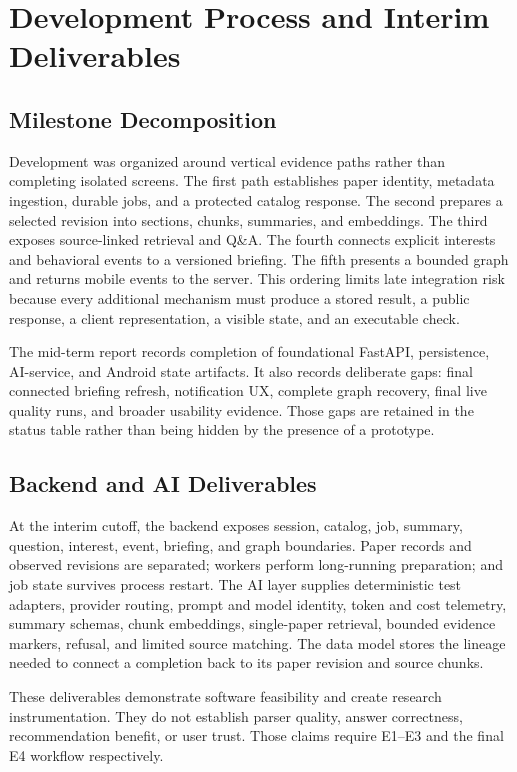 \section{Development Process and Interim Deliverables}

\subsection{Milestone Decomposition}

Development was organized around vertical evidence paths rather than completing isolated screens.
The first path establishes paper identity, metadata ingestion, durable jobs, and a protected catalog response.
The second prepares a selected revision into sections, chunks, summaries, and embeddings.
The third exposes source-linked retrieval and Q\&A.
The fourth connects explicit interests and behavioral events to a versioned briefing.
The fifth presents a bounded graph and returns mobile events to the server.
This ordering limits late integration risk because every additional mechanism must produce a stored result, a public response, a client representation, a visible state, and an executable check.

The mid-term report records completion of foundational FastAPI, persistence, AI-service, and Android state artifacts.
It also records deliberate gaps: final connected briefing refresh, notification UX, complete graph recovery, final live quality runs, and broader usability evidence.
Those gaps are retained in the status table rather than being hidden by the presence of a prototype.

\subsection{Backend and AI Deliverables}

At the interim cutoff, the backend exposes session, catalog, job, summary, question, interest, event, briefing, and graph boundaries.
Paper records and observed revisions are separated; workers perform long-running preparation; and job state survives process restart.
The AI layer supplies deterministic test adapters, provider routing, prompt and model identity, token and cost telemetry, summary schemas, chunk embeddings, single-paper retrieval, bounded evidence markers, refusal, and limited source matching.
The data model stores the lineage needed to connect a completion back to its paper revision and source chunks.

These deliverables demonstrate software feasibility and create research instrumentation.
They do not establish parser quality, answer correctness, recommendation benefit, or user trust.
Those claims require E1--E3 and the final E4 workflow respectively.

